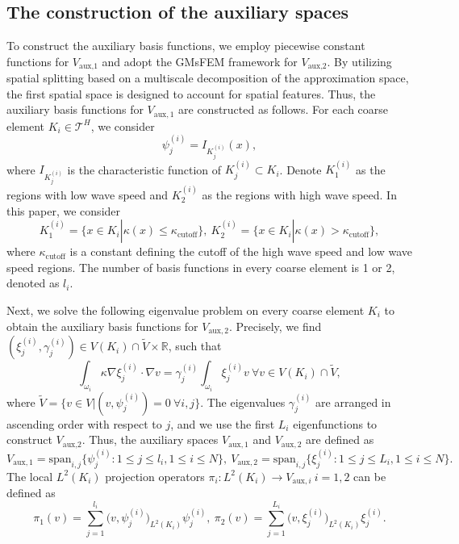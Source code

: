 \documentclass[preprint,12pt]{elsarticle}
\begin{document}
\subsection{The construction of the auxiliary spaces}
To construct the auxiliary basis functions, we employ piecewise constant functions for $V_{\text{aux,1}}$ and adopt the GMsFEM framework for $V_{\text{aux,2}}$.
By utilizing spatial splitting based on a multiscale decomposition of the approximation space, the first spatial space is designed to account for spatial features. 
Thus, the auxiliary basis functions for $V_{\text{aux},1}$ are constructed as follows. For each coarse element $K_{i}\in \mathcal{T}^H$, we consider
$$\psi_j^{(i)}=I_{K_j^{(i)}}(x),$$
where $I_{K_j^{(i)}}$ is the characteristic function of $K_j^{(i)}\subset K_i$. Denote $K_1^{(i)}$ as the regions with low wave speed and $K_2^{(i)}$ as the regions with high wave speed. In this paper, we consider 
$$K_1^{(i)}=\{x\in K_i|\kappa(x)\leq \kappa_{\text{cutoff}}\},~K_2^{(i)}=\{x\in K_i|\kappa(x)> \kappa_{\text{cutoff}}\},$$ where $\kappa_{\text{cutoff}}$ is a constant defining the cutoff of the high wave speed and low wave speed regions. The number of basis functions in every coarse element is 1 or 2, denoted as $l_i$.

Next, we solve the following eigenvalue problem on every coarse element $K_i$ to obtain the auxiliary basis functions for $V_{\text{aux},2}$. Precisely, we find $(\xi_j^{(i)},\gamma_j^{(i)})\in V(K_i)\cap \tilde{V}\times \mathbb{R}$, such that
$$\int_{\omega_i}\kappa\nabla\xi_j^{(i)}\cdot\nabla v=\gamma_j^{(i)}\int_{\omega_i}\xi_j^{(i)}v~\forall v\in V(K_i)\cap\tilde{V},$$
where $\tilde{V}=\{v\in V|(v,\psi_j^{(i)})=0~\forall i,j\}$. The eigenvalues $\gamma_j^{(i)}$ are arranged in ascending order with respect to $j$, and we use the first $L_i$ eigenfunctions to construct $V_{\text{aux,2}}$.
Thus, the auxiliary spaces $V_{\text{aux},1}$ and $V_{\text{aux},2}$ are defined as 
$$V_{\text{aux},1}=\text{span}_{i,j}\Big\{\psi_j^{(i)}:1\leq j\leq l_i,1\leq i\leq N\Big\},~V_{\text{aux},2}=\text{span}_{i,j}\Big\{\xi_j^{(i)}:1\leq j\leq L_i,1\leq i\leq N\Big\}.$$
The local $L^2(K_i)$ projection operators $\pi_i:L^2(K_i)\rightarrow{V_{\text{aux},i}}~i=1,2$ can be defined as
$$\pi_1(v)=\sum_{j=1}^{l_i}\Big(v,\psi_j^{(i)}\Big)_{L^2(K_i)}\psi_j^{(i)},~\pi_2(v)=\sum_{j=1}^{L_i}\Big(v,\xi_j^{(i)}\Big)_{L^2(K_i)}\xi_j^{(i)}.$$
\end{document}
